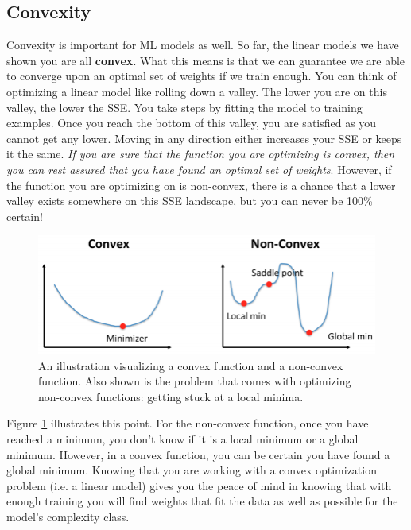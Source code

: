 \subsection{Convexity}
\begin{flushleft}
    \large Convexity is important for ML models as well. So far, the linear models we have shown you are all \textbf{convex}. What this means is that we can guarantee we are able to converge upon an optimal set of weights if we train enough. You can think of optimizing a linear model like rolling down a valley. The lower you are on this valley, the lower the SSE. You take steps by fitting the model to training examples. Once you reach the bottom of this valley, you are satisfied as you cannot get any lower. Moving in any direction either increases your SSE or keeps it the same. \textit{If you are sure that the function you are optimizing is convex, then you can rest assured that you have found an optimal set of weights}. However, if the function you are optimizing on is non-convex, there is a chance that a lower valley exists somewhere on this SSE landscape, but you can never be 100\% certain!

    \begin{figure}[H]
        \centering
        \includegraphics[width=0.8\linewidth]{ml/convexity.png}
        \caption{An illustration visualizing a convex function and a non-convex function. Also shown is the problem that comes with optimizing non-convex functions: getting stuck at a local minima.}
        \label{fig:convexity}
    \end{figure}
    
    Figure \ref{fig:convexity} illustrates this point. For the non-convex function, once you have reached a minimum, you don't know if it is a local minimum or a global minimum. However, in a convex function, you can be certain you have found a global minimum. Knowing that you are working with a convex optimization problem (i.e. a linear model) gives you the peace of mind in knowing that with enough training you will find weights that fit the data as well as possible for the model's complexity class.
\end{flushleft}

